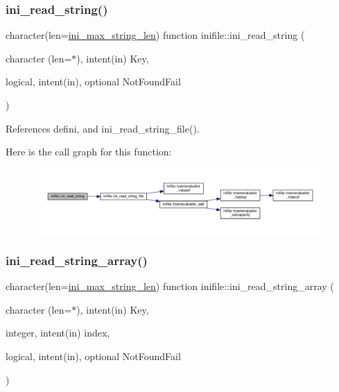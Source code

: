 \subsubsection{\texorpdfstring{ini\+\_\+read\+\_\+string()}{ini\_read\_string()}}
{\footnotesize\ttfamily character(len=\mbox{\hyperlink{namespaceinifile_a32faebf83b580d14b5af965dcb4eebfd}{ini\+\_\+max\+\_\+string\+\_\+len}}) function inifile\+::ini\+\_\+read\+\_\+string (\begin{DoxyParamCaption}\item[{character (len=$\ast$), intent(in)}]{Key,  }\item[{logical, intent(in), optional}]{Not\+Found\+Fail }\end{DoxyParamCaption})}



References defini, and ini\+\_\+read\+\_\+string\+\_\+file().

Here is the call graph for this function\+:
\nopagebreak
\begin{figure}[H]
\begin{center}
\leavevmode
\includegraphics[width=350pt]{namespaceinifile_a3e13a763ec2647b0a011c509a529ffbf_cgraph}
\end{center}
\end{figure}
\mbox{\label{namespaceinifile_af85df5c619b25702ba2acfebf00f3c60}} 
\subsubsection{\texorpdfstring{ini\+\_\+read\+\_\+string\+\_\+array()}{ini\_read\_string\_array()}}
{\footnotesize\ttfamily character(len=\mbox{\hyperlink{namespaceinifile_a32faebf83b580d14b5af965dcb4eebfd}{ini\+\_\+max\+\_\+string\+\_\+len}}) function inifile\+::ini\+\_\+read\+\_\+string\+\_\+array (\begin{DoxyParamCaption}\item[{character (len=$\ast$), intent(in)}]{Key,  }\item[{integer, intent(in)}]{index,  }\item[{logical, intent(in), optional}]{Not\+Found\+Fail }\end{DoxyParamCaption})}



